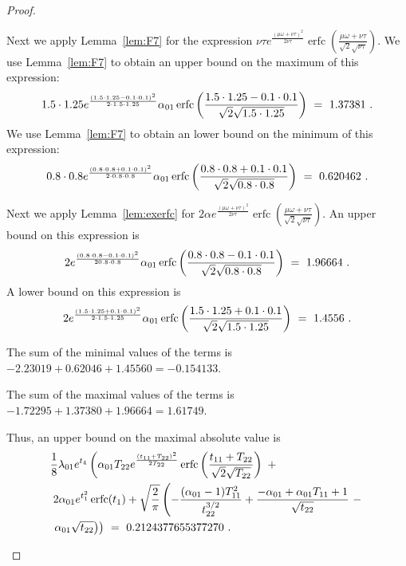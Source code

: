\documentclass{article}
\DeclareMathOperator{\erfc}{erfc}
\begin{document}
\begin{proof}
\begin{itemize}
Next we apply Lemma~\ref{lem:F7} for the expression $\nu \tau e^{\frac{(\mu \omega+\nu \tau)^2}{2 \nu \tau}} \erfc \left(\frac{\mu \omega+\nu \tau}{\sqrt{2} \sqrt{\nu \tau}}\right)$.
We use Lemma~\ref{lem:F7} to obtain
an upper bound on the maximum of this expression:
\begin{align}
1.5 \cdot 1.25 e^{\frac{(1.5 \cdot 1.25-0.1 \cdot 0.1)^2}{2 \cdot 1.5 \cdot 1.25}} \alpha_{\rm 01}
  \erfc \left(\frac{1.5 \cdot 1.25-0.1 \cdot 0.1}{\sqrt{2} \sqrt{1.5 \cdot 
  1.25}}\right) \ = \
1.37381 \ .
\end{align}
We use Lemma~\ref{lem:F7} to obtain
an lower bound on the minimum of this expression:
\begin{align}
0.8 \cdot 0.8 e^{\frac{(0.8 \cdot 0.8 + 0.1 \cdot 0.1)^2}{2 \cdot 0.8 \cdot 0.8}} \alpha_{\rm 01} \erfc \left(\frac{0.8 \cdot 0.8 + 0.1 \cdot 0.1}{\sqrt{2} \sqrt{0.8 \cdot 0.8}}\right) \ = \
0.620462\ .
\end{align}

Next we apply Lemma~\ref{lem:exerfc} for $2 \alpha  e^{\frac{(\mu \omega+\nu \tau)^2}{2 \nu \tau}} \erfc \left(\frac{\mu \omega+\nu \tau}{\sqrt{2} \sqrt{\nu \tau}}\right)$.
An upper bound on this expression is
\begin{align}
2 e^{\frac{(0.8 \cdot 0.8-0.1 \cdot 0.1)^2}{2 0.8 \cdot 0.8}} \alpha_{\rm 01}
  \erfc \left(\frac{0.8 \cdot 0.8-0.1 \cdot 0.1}{\sqrt{2} 
\sqrt{0.8 \cdot 0.8}}\right) \ = \ 1.96664 \ .
\end{align}
A lower bound on this expression is
\begin{align}
2 e^{\frac{(1.5 \cdot 1.25+0.1 \cdot 0.1)^2}{2 \cdot 1.5 \cdot 1.25}} \alpha_{\rm 01}
  \erfc \left(\frac{1.5 \cdot 1.25+0.1 \cdot 0.1}{\sqrt{2} \sqrt{1.5 \cdot 
  1.25}}\right) \ = \ 1.4556 \ .
\end{align}

The sum of the minimal values of the terms is
$-2.23019 + 0.62046 + 1.45560 = -0.154133$.

The sum of the maximal values of the terms is
$-1.72295 + 1.37380 + 1.96664 = 1.61749$.


Thus, an upper bound on the maximal absolute value is 
\begin{align}
&\frac{1}{8} \lambda_{\rm 01} e^{t_4} \left(\alpha_{\rm 01} T_{22} e^{\frac{(t_{11}+T_{22})^2}{2 T_{22}}}
  \erfc \left(\frac{t_{11}+T_{22}}{\sqrt{2}
  \sqrt{T_{22}}}\right)\ + \right. \\
  \nonumber &\left.   2 \alpha_{\rm 01}
  e^{t_1^2} \erfc (t_1)+\sqrt{\frac{2}{\pi }}
  \left(-\frac{(\alpha_{\rm 01}-1)
  T_{11}^2}{t_{22}^{3/2}}+\frac{-\alpha_{\rm 01} + \alpha_{\rm 01}
  T_{11}+1}{\sqrt{t_{22}}}\ - \right. \right. \\
  \nonumber &\left.\left.  \alpha_{\rm 01}
  \sqrt{t_{22}}\right)\right) \ = \ 0.2124377655377270\ .
\end{align}


\end{itemize}
\end{proof}
\end{document}
